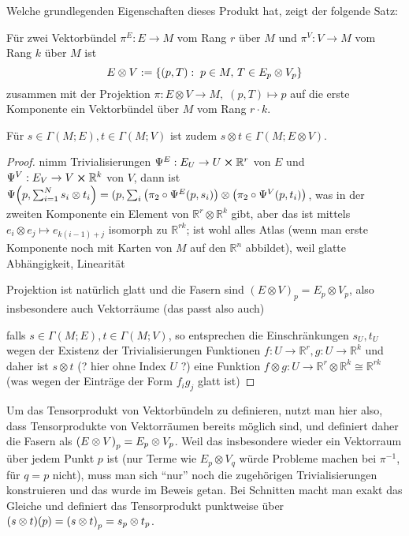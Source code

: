 \documentclass[../H_Analysis_main.tex]{subfiles}
\begin{document}
Welche grundlegenden Eigenschaften dieses Produkt hat, zeigt der folgende Satz:
\begin{satz}%
Für zwei Vektorbündel $\pi^E: E \rightarrow M$ vom Rang $r$ über $M$ und $\pi^V: V \rightarrow M$ vom Rang $k$ über $M$ ist
\begin{equation}
E \otimes V := \qty{(p, T): \; p \in M, \, T \in E_p \otimes V_p}
\end{equation}
zusammen mit der Projektion $\pi: E \otimes V \rightarrow M, \; (p, T) \mapsto p$ auf die erste Komponente ein Vektorbündel über $M$ vom Rang $r \cdot k$.


Für $s \in \Gamma(M; E), t \in \Gamma(M; V)$ ist zudem $s \otimes t \in \Gamma(M; E \otimes V)$.
\end{satz}
\begin{proof}
nimm Trivialisierungen $\Psi^E: E_U \rightarrow U \cross \mathbb{R}^r$ von $E$ und $\Psi^V: E_V \rightarrow V \cross \mathbb{R}^k$ von $V$, dann ist $\Psi\qty(p, \sum_{i = 1}^N s_i \otimes t_i) = (p, \sum_i \qty(\pi_2 \circ \Psi^E(p, s_i)) \otimes \qty(\pi_2 \circ \Psi^V(p, t_i))$, was in der zweiten Komponente ein Element von $\mathbb{R}^r \otimes \mathbb{R}^k$ gibt, aber das ist mittels $e_ i \otimes e_j \mapsto e_{k (i - 1) + j}$ isomorph zu $\mathbb{R}^{ r k}$; ist wohl alles Atlas (wenn man erste Komponente noch mit Karten von $M$ auf den $\mathbb{R}^n$ abbildet), weil glatte Abhängigkeit, Linearität

Projektion ist natürlich glatt und die Fasern sind $(E \otimes V)_p = E_p \otimes V_p$, also insbesondere auch Vektorräume (das passt also auch)

falls $s \in \Gamma(M; E), t \in \Gamma(M; V)$, so entsprechen die Einschränkungen $s_U, t_U$ wegen der Existenz der Trivialisierungen Funktionen $f: U \rightarrow \mathbb{R}^r, g: U \rightarrow \mathbb{R}^k$ und daher ist $s \otimes t$ (? hier ohne Index $U$ ?) eine Funktion $f \otimes g: U \rightarrow \mathbb{R}^r \otimes \mathbb{R}^k \cong \mathbb{R}^{r k}$ (was wegen der Einträge der Form $f_i g_j$ glatt ist)
\end{proof}

Um das Tensorprodukt von Vektorbündeln zu definieren, nutzt man hier also, dass Tensorprodukte von Vektorräumen bereits möglich sind, und definiert daher die Fasern als $\qty(E \otimes V)_p = E_p \otimes V_p$. Weil das insbesondere wieder ein Vektorraum über jedem Punkt $p$ ist (nur Terme wie $E_p \otimes V_q$ würde Probleme machen bei $\pi^{-1}$, für $q = p$ nicht), muss man sich \enquote{nur} noch die zugehörigen Trivialisierungen konstruieren und das wurde im Beweis getan. Bei Schnitten macht man exakt das Gleiche und definiert das Tensorprodukt punktweise über $\qty(s \otimes t)(p) = \qty(s \otimes t)_p = s_p \otimes t_p$.%
\end{document}

